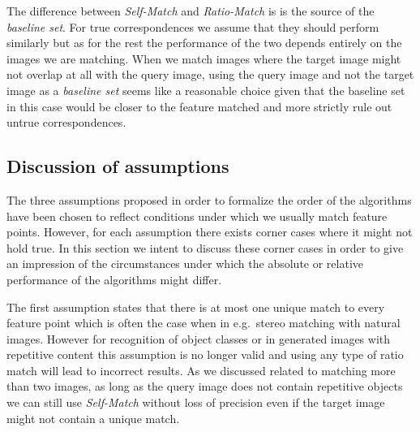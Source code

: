 \documentclass[journal]{IEEEtran}
\begin{document}
The difference between \emph{Self-Match} and \emph{Ratio-Match} is is 
the source of the \emph{baseline set}. For true correspondences we 
assume that they should perform similarly but as for the rest the 
performance of the two depends entirely on the images we are matching. 
When we match images where the target image might not overlap at all 
with the query image, using the query image and not the target image as 
a \emph{baseline set} seems like a reasonable choice given that the 
baseline set in this case would be closer to the feature matched and 
more strictly rule out untrue correspondences.


\subsection{Discussion of assumptions}
\label{ref:disc_assumptions}




The three assumptions proposed in order to formalize the order of the 
algorithms have been chosen to reflect conditions under which we usually 
match feature points. However, for each assumption there exists corner 
cases where it might not hold true. In this section we intent to discuss 
these corner cases in order to give an impression of the circumstances 
under which the absolute or relative performance of the algorithms might 
differ.

The first assumption states that there is at most one unique match to 
every feature point which is often the case when in e.g.\ stereo 
matching with natural images. However for recognition of object classes 
or in generated images with repetitive content this assumption is no 
longer valid and using any type of ratio match will lead to incorrect 
results.  As we discussed related to matching more than two images, as 
long as the query image does not contain repetitive objects we can still 
use \emph{Self-Match} without loss of precision even if the target image 
might not contain a unique match.
\end{document}
